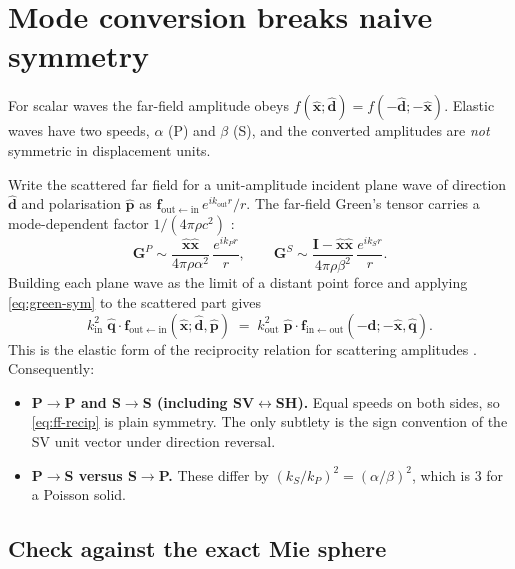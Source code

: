 \documentclass[11pt,a4paper]{article}
\newcommand{\bG}{\mathbf{G}}
\newcommand{\bI}{\mathbf{I}}
\newcommand{\bfv}{\mathbf{f}}
\newcommand{\xhat}{\hat{\mathbf{x}}}
\newcommand{\dhat}{\hat{\mathbf{d}}}
\newcommand{\phat}{\hat{\mathbf{p}}}
\newcommand{\qhat}{\hat{\mathbf{q}}}
\newcommand{\kin}{k_{\mathrm{in}}}
\newcommand{\kout}{k_{\mathrm{out}}}
\newcommand{\fout}{\bfv_{\mathrm{out}\leftarrow\mathrm{in}}}
\newcommand{\fin}{\bfv_{\mathrm{in}\leftarrow\mathrm{out}}}
\begin{document}
\section{Mode conversion breaks naive symmetry}
\label{sec:naive}

For scalar waves the far-field amplitude obeys
$f(\xhat; \dhat) = f(-\dhat; -\xhat)$. Elastic waves have two speeds,
$\alpha$ (P) and $\beta$ (S), and the converted amplitudes are
\emph{not} symmetric in displacement units.

Write the scattered far field for a unit-amplitude incident plane wave
of direction $\dhat$ and polarisation $\phat$ as
$\fout\, e^{i\kout r}/r$. The far-field Green's tensor carries a
mode-dependent factor $1/(4\pi\rho c^2)$ \citep[\S4.2]{AkiRichards2002}:
\begin{equation}
  \bG^{P} \sim \frac{\xhat\xhat}{4\pi\rho\alpha^2}\,\frac{e^{ik_P r}}{r},
  \qquad
  \bG^{S} \sim \frac{\bI - \xhat\xhat}{4\pi\rho\beta^2}\,\frac{e^{ik_S r}}{r}.
  \label{eq:green-ff}
\end{equation}
Building each plane wave as the limit of a distant point force and
applying \eqref{eq:green-sym} to the scattered part gives
\begin{equation}
  \kin^{2}\; \qhat \cdot \fout(\xhat; \dhat, \phat)
  \;=\;
  \kout^{2}\; \phat \cdot \fin(-\dhat; -\xhat, \qhat).
  \label{eq:ff-recip}
\end{equation}
This is the elastic form of the reciprocity relation for scattering
amplitudes \citep{PaoVaratharajulu1976,Varatharajulu1977}.
Consequently:
\begin{itemize}
\item \textbf{P$\to$P and S$\to$S (including SV$\leftrightarrow$SH).}
  Equal speeds on both sides, so \eqref{eq:ff-recip} is plain symmetry.
  The only subtlety is the sign convention of the SV unit vector under
  direction reversal.
\item \textbf{P$\to$S versus S$\to$P.} These differ by
  $(k_S/k_P)^2 = (\alpha/\beta)^2$, which is $3$ for a Poisson solid.
\end{itemize}

\subsection{Check against the exact Mie sphere}
\label{sec:mie-check}
\end{document}

